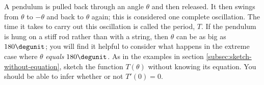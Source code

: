 A pendulum is pulled back through an angle $\theta$ and then released.
It then swings from $\theta$ to $-\theta$ and back to $\theta$ again;
this is considered one complete oscillation.
The time it takes to carry out this oscillation is called the period,
$T$. If the pendulum is hung on a stiff rod rather than with a string,
then $\theta$ can be as big as $180\degunit$; you will find it helpful
to consider what happens in the extreme case where $\theta$ \emph{equals}
$180\degunit$.
As in the examples
in section \ref{subsec:sketch-without-equation}, sketch the function
$T(\theta)$ without knowing its equation. You should be able to infer
whether or not $T'(0)=0$.
